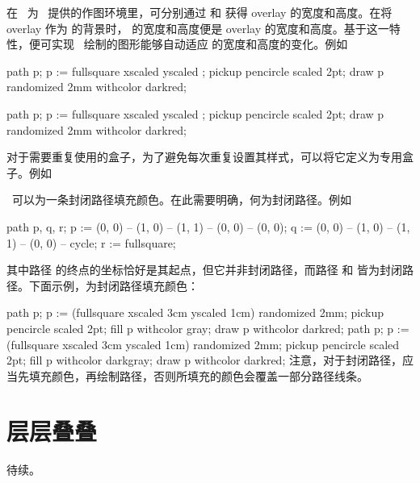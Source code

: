 \starttyping
{}
\stoptyping
{}

在 \ConTeXt\ 为 \MetaPost\ 提供的作图环境里，可分别通过 \type{\overlaywidth} 和 \type{\overlayheight} 获得 overlay 的宽度和高度。在将 overlay 作为 \type{\framed} 的背景时，\type{\framed} 的宽度和高度便是 overlay 的宽度和高度。基于这一特性，便可实现 \MetaPost\ 绘制的图形能够自动适应 \type{\framed} 的宽度和高度的变化。例如

\starttyping[option=MP]
path p;
p := fullsquare xscaled \overlaywidth yscaled \overlayheight;
pickup pencircle scaled 2pt;
draw p randomized 2mm withcolor darkred;
\stopuseMPgraphic

\stoptyping

path p;
p := fullsquare xscaled \overlaywidth yscaled \overlayheight;
pickup pencircle scaled 2pt;
draw p randomized 2mm withcolor darkred;
\stopuseMPgraphic


对于需要重复使用的盒子，为了避免每次重复设置其样式，可以将它定义为专用盒子。例如

\starttyping[option=TEX]
\stoptyping

\MetaPost\ 可以为一条封闭路径填充颜色。在此需要明确，何为封闭路径。例如

\starttyping[option=MP]
path p, q, r;
p := (0, 0) -- (1, 0) -- (1, 1) -- (0, 0) -- (0, 0);
q := (0, 0) -- (1, 0) -- (1, 1) -- (0, 0) -- cycle;
r := fullsquare;
\stoptyping

\noindent 其中路径  的终点的坐标恰好是其起点，但它并非封闭路径，而路径  和  皆为封闭路径。下面示例，为封闭路径填充颜色：

\starttyping[option=MP]
path p;
p := (fullsquare xscaled 3cm yscaled 1cm) randomized 2mm;
pickup pencircle scaled 2pt;
fill p withcolor gray;
draw p withcolor darkred;
\stoptyping
\startMPcode
path p;
p := (fullsquare xscaled 3cm yscaled 1cm) randomized 2mm;
pickup pencircle scaled 2pt;
fill p withcolor darkgray;
draw p withcolor darkred;
\stopMPcode
\noindent 注意，对于封闭路径，应当先填充颜色，再绘制路径，否则所填充的颜色会覆盖一部分路径线条。

\section{层层叠叠}

待续。
